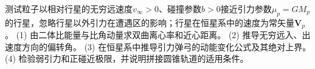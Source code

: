 测试粒子以相对行星的无穷远速度\(v_\infty>0\)、碰撞参数\(b>0\)接近引力参数\(\mu_p=GM_p\)的行星，忽略行星以外引力在遭遇区的影响；行星在恒星系中的速度为常矢量\(\boldsymbol V_p\)。
(1) 由二体比能量与比角动量求双曲离心率和近心距离。
(2) 推导无穷远入、出速度方向的偏转角。
(3) 在恒星系中推导引力弹弓的动能变化公式及其绝对上界。
(4) 检验弱引力和正碰近极限，并说明拼接圆锥轨道的适用条件。
